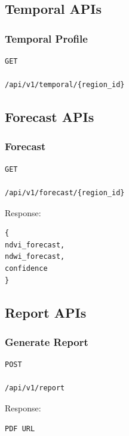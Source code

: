 \documentclass[11pt,a4paper]{article}
\begin{document}
\subsection{Temporal APIs}

\subsubsection{Temporal Profile}

\begin{verbatim}
GET

/api/v1/temporal/{region_id}
\end{verbatim}

\subsection{Forecast APIs}

\subsubsection{Forecast}

\begin{verbatim}
GET

/api/v1/forecast/{region_id}
\end{verbatim}

Response:

\begin{verbatim}
{
ndvi_forecast,
ndwi_forecast,
confidence
}
\end{verbatim}

\subsection{Report APIs}

\subsubsection{Generate Report}

\begin{verbatim}
POST

/api/v1/report
\end{verbatim}

Response:

\begin{verbatim}
PDF URL
\end{verbatim}
\end{document}
